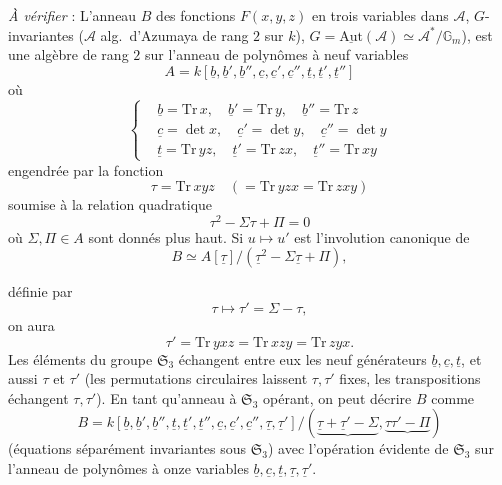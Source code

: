 \documentclass[11pt,a4paper]{article}
\begin{document}
\emph{À vérifier} : L'anneau $B$  des fonctions $F(x,y,z)$ en trois
variables dans $\mathcal{A}$, $G$-invariantes  ($\mathcal{A}$ alg.\
d'Azumaya de rang $2$ sur $k$), $G = \underline{\mathrm{Aut}}(\mathcal{A}) \simeq
\mathcal{A}^* / \mathbb{G}_m$), est une algèbre \struck{libre} \add{finie libre} de
rang $2$ sur l'anneau de polynômes à neuf variables
\[
  A = k[\underline{b}, \underline{b}', \underline{b}'', \underline{c}, \underline{c}', \underline{c}'',
  \underline{t}, \underline{t}', \underline{t}'']
\]
où
\[
  \left\{
  \begin{aligned}
    &\underline{b} = \mathrm{Tr}\, x, \quad \underline{b}' = \mathrm{Tr}\, y, \quad \underline{b}'' = \mathrm{Tr}\, z \\
    &\underline{c} = \det x, \quad \underline{c}' = \det y, \quad \underline{c}'' = \det y \\
    &\underline{t} = \mathrm{Tr}\, yz, \quad \underline{t}' = \mathrm{Tr}\, zx, \quad \underline{t}'' = \mathrm{Tr}\, xy
  \end{aligned}
  \right.
\]
engendrée par la fonction
\[
  \tau = \mathrm{Tr}\, xyz \quad (= \mathrm{Tr}\, yzx = \mathrm{Tr}\, zxy)
\]
soumise à la relation quadratique
\[
  \boxed{\tau^2 - \Sigma\tau + \Pi = 0}
\]
où \struck{$\Sigma, \Pi$} $\Sigma, \Pi \in A$ sont donnés plus haut. Si $u \mapsto u'$
est l'involution canonique de
\[
  B \simeq A[\underline{\tau}] / (\underline{\tau}^2 - \Sigma\underline{\tau} + \Pi) ,
\]

définie par
\[
  \tau \longmapsto \tau' = \Sigma - \tau ,
\]
on aura
\[
  \tau' = \mathrm{Tr}\, yxz = \mathrm{Tr}\, xzy = \mathrm{Tr}\, zyx .
\]
Les éléments du groupe $\mathfrak{S}_3$ échangent entre eux les neuf générateurs
$\underline{b}, \underline{c}, \underline{t}$, et aussi $\tau$ et $\tau'$ (les
permutations circulaires laissent $\tau, \tau'$ fixes, les transpositions échangent
$\tau, \tau'$). En \struck{\ill{}} tant qu'anneau à $\mathfrak{S}_3$
opérant, on peut décrire $B$ comme
\[
  B = k[\underline{b}, \underline{b}', \underline{b}'', \underline{t}, \underline{t}', \underline{t}'',
  \underline{c}, \underline{c}', \underline{c}'', \underline{\tau}, \underline{\tau}']
  / (\underbrace{\underline{\tau} + \underline{\tau}' - \Sigma}, \underbrace{\tau\tau' - \Pi})
\]
(équations séparément invariantes sous $\mathfrak{S}_3$) avec l'opération évidente de
$\mathfrak{S}_3$ sur l'anneau de polynômes à onze variables $\underline{b},
\underline{c}, \underline{t}, \underline{\tau}, \underline{\tau}'$.
\end{document}
